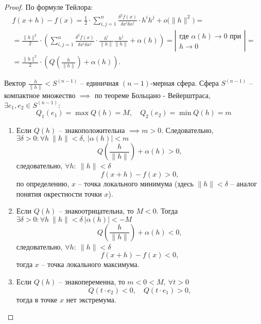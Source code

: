 \begin{proof}
    По формуле Тейлора:
    \begin{multline*}
        f(x+h) - f(x) = \frac{1}{2}\cdot \sum_{i,j=1}^{n}\frac{\delta^2f(x)}{\delta x^i \delta x^j}\cdot h^ih^j + o\big(\|h\|^2\big) = \\
        = \frac{\|h\|^2}{2}\cdot\left(\sum_{i,j=1}^{n}\frac{\delta^2f(x)}{\delta x^i\delta x^j}\cdot \frac{h^i}{\|h\|}\frac{h^j}{\|h\|} + \alpha(h)\right) = \left|\begin{array}{c}
            \text{где }\alpha(h)\rightarrow 0\text{ при} \\
            h \rightarrow 0
        \end{array}\right| = \\
        = \frac{\|h\|^2}{2}\cdot\left(Q\left(\frac{h}{\|h\|}\right) + \alpha(h)\right).
    \end{multline*}

    Вектор $\frac{h}{\|h\|} < S^{(n-1)}$ -- единичная $(n-1)$-мерная сфера. Сфера $S^{(n-1)}$ -- компактное множество $\implies$ по теореме Больцано - Вейерштраса, $\exists e_1,e_2 \in S^{(n-1)}:$
    \[
        Q_1(e_1) = \max Q(h) = M, \quad Q_2(e_2) = \min Q(h) = m
    \]

    \begin{enumerate}
        \item Если $Q(h)$ -- знакоположительна $\implies m > 0$. Следовательно, $ \exists \delta > 0: \forall h \ \|h\| < \delta, \ |\alpha(h)| < m $
              \[
                  Q\left(\frac{h}{\|h\|}\right) + \alpha(h) > 0,
              \] следовательно, $ \forall h: \ \|h\| < \delta $
              \[
                  f(x+h) - f(x) > 0,
              \] по определению, $x$ -- точка локального минимума (здесь $\|h\| < \delta$ -- аналог понятия окрестности точки $x$).
        \item Если $Q(h)$ -- знакоотрицательна, то $M < 0$. Тогда $ \exists \delta > 0: \forall h \ \|h\| < \delta \ |\alpha(h)| < -M$
              \[
                  Q\left(\frac{h}{\|h\|}\right) + \alpha(h) < 0,
              \] следовательно, $ \forall h: \ \|h\| < \delta $
              \[
                  f(x+h) - f(x) < 0,
              \] тогда $ x $ -- точка локального максимума.
        \item Если $Q(h)$ -- знакопеременна, то $m < 0 < M, \ \forall t > 0$
              \[
                  Q(t\cdot e_2) < 0, \quad Q(t \cdot e_1) > 0,
              \] тогда в точке $x$ нет экстремума.
    \end{enumerate}
\end{proof}

